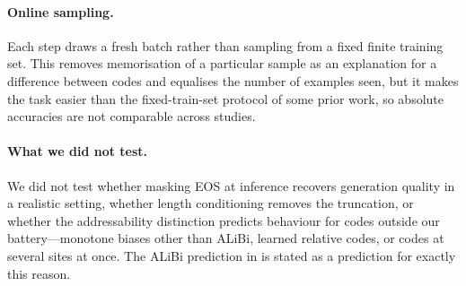 \paragraph{Online sampling.} Each step draws a fresh batch rather than sampling from
a fixed finite training set. This removes memorisation of a particular sample as an
explanation for a difference between codes and equalises the number of examples
seen, but it makes the task easier than the fixed-train-set protocol of some prior
work, so absolute accuracies are not comparable across studies.

\paragraph{What we did not test.} We did not test whether masking EOS at inference
recovers generation quality in a realistic setting, whether length conditioning
removes the truncation, or whether the addressability distinction predicts
behaviour for codes outside our battery---monotone biases other than ALiBi,
learned relative codes, or codes at several sites at once. The ALiBi prediction in
 is stated as a prediction for exactly this reason.
